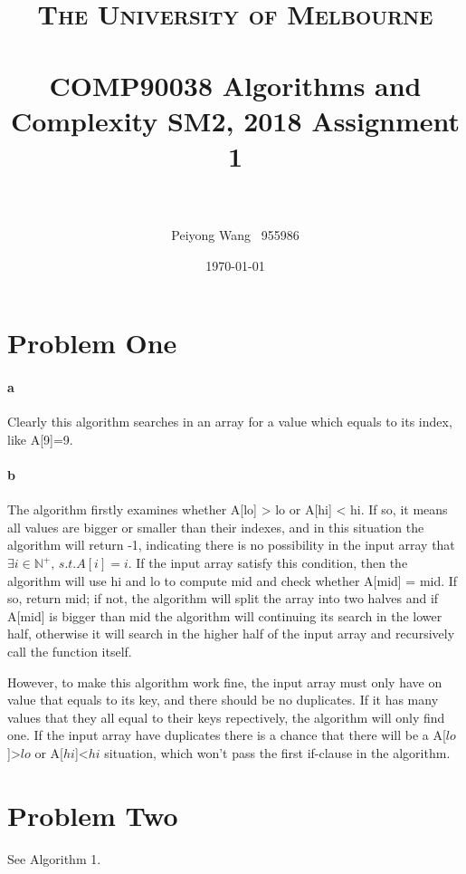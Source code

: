 \documentclass[paper=a4, fontsize=11pt]{scrartcl} %
\title{	
\normalfont \normalsize 
\textsc{The University of Melbourne } \\ [25pt] %
\horrule{0.5pt} \\[0.4cm] %
\huge COMP90038 Algorithms and Complexity SM2, 2018
Assignment 1 \\ %
\horrule{2pt} \\[0.5cm] %
}
\author{Peiyong Wang $\,$ 955986} %
\date{\normalsize\today} %
\numberwithin{equation}{section} %
\numberwithin{figure}{section} %
\numberwithin{table}{section} %
\begin{document}
\maketitle %



\section{Problem One}
\paragraph{a} Clearly this algorithm searches in an array for a value which equals to its index, like A[9]=9.
\paragraph{b} The algorithm firstly examines whether A[lo] > lo or A[hi] < hi. If so, it means all values are bigger or smaller than their indexes, and in this situation the algorithm will return -1, indicating there is no possibility in the input array that $\exists i \in  \mathbb{N^+},\, s.t. A[i] = i $. If the input array satisfy this condition, then the algorithm will use hi and lo to compute mid and check whether A[mid] = mid. If so, return mid; if not, the algorithm will split the array into two halves and if A[mid] is bigger than mid the algorithm will continuing its search in the lower half, otherwise it will search in the higher half of the input array and recursively call the function itself.

\vbox{ }

However, to make this algorithm work fine, the input array must only have on value that equals to its key, and there should be no duplicates.
If it has many values that they all equal to their keys repectively, the algorithm will only find one. If the input array have duplicates there is a chance that there will be a A[$lo$]>$lo$ or A[$hi$]<$hi$ 
situation, which won't pass the first if-clause in the algorithm.
\section{Problem Two}


See Algorithm 1.
\end{document}
